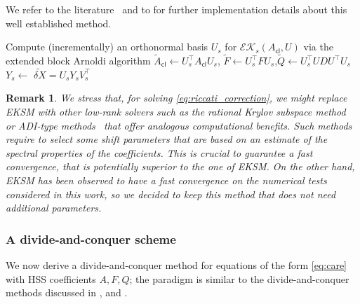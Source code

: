 \documentclass[a4paper,10pt]{article}
\newtheorem{remark}{Remark}
\newcommand{\upd}[1]{{\color{black}#1}} %
\begin{document}
We refer to the literature~\cite{simoncini14,simoncini16b} and to \cite[Section 3.2]{kressner20} for further  implementation details about this well established method.

\begin{algorithm}
	\caption{Extended Krylov subspace method for solving $A_{\mathsf{cl}}^\top\delta X +\delta XA_{\mathsf{cl}}- \delta XF\delta X = UDU^\top$}\label{alg:EKSM}
	\begin{algorithmic}[1]
		\State Compute (incrementally) an orthonormal basis $U_s$ for $\mathcal{EK}_s(A_{\mathsf{cl}},U)$ via the extended block Arnoldi algorithm \label{step:arnoldi}
		\State $\widetilde A_{\mathsf{cl}}\gets U_s^\top A_{\mathsf{cl}} U_s$, \quad $\widetilde F \gets U_s^\top FU_s$,\quad $\widetilde Q\gets U_s^\top UDU^\top U_s$
		\State $Y_s\gets$  
		\State \Return $\widetilde {\delta X} =U_sY_sV_s^\top$
		\EndIf
		\EndFor 
		\EndProcedure
	\end{algorithmic}
\end{algorithm}

\begin{remark} 
We stress that, for solving \eqref{eq:riccati_correction}, we might replace EKSM with other low-rank solvers such as the rational Krylov subspace method~\cite{simoncini14,simoncini16b} or ADI-type methods~\cite{radi18} that offer analogous computational benefits. Such methods require to select some shift parameters that are based on an estimate of the spectral properties of the coefficients. This is crucial to guarantee a fast convergence, that is potentially superior to the one of EKSM. On the other hand, EKSM has been observed to have a fast convergence on the numerical tests considered in this work, so we decided to keep this method that \upd{does} not need additional parameters. 
\end{remark}

\subsubsection{A divide-and-conquer scheme}
We now derive a divide-and-conquer method for  equations of the form \eqref{eq:care} with HSS coefficients $A,F,Q$; the paradigm is  similar to the divide-and-conquer methods discussed in \cite{kressner20}, and \cite{kressner19}.
 
\end{document}
